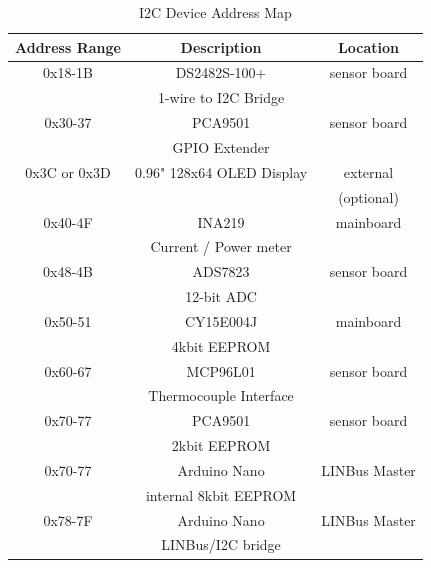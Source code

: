 \documentclass[lettersize,journal]{IEEEtran}
\begin{document}
\begin{table}
\begin{center}
\caption{I2C Device Address Map}
\label{i2c-addresses}
\begin{tabular}{| c | c | c |}
\hline
Address Range & Description & Location \\
\hline
0x18-1B & DS2482S-100+ & sensor board \\
& 1-wire to I2C Bridge & \\
\hline
0x30-37 & PCA9501 & sensor board \\
& GPIO Extender & \\
\hline
0x3C or 0x3D & 0.96" 128x64 OLED Display & external \\
& & (optional) \\
\hline
0x40-4F & INA219 & mainboard \\
& Current / Power meter & \\
\hline
0x48-4B & ADS7823 & sensor board \\
& 12-bit ADC & \\
\hline
0x50-51 & CY15E004J & mainboard \\
& 4kbit EEPROM & \\
\hline
0x60-67 & MCP96L01 & sensor board \\
& Thermocouple Interface & \\
\hline
0x70-77 & PCA9501 & sensor board \\
& 2kbit EEPROM & \\
\hline
0x70-77 & Arduino Nano & LINBus Master \\
& internal 8kbit EEPROM & \\
\hline
0x78-7F & Arduino Nano & LINBus Master \\
& LINBus/I2C bridge & \\
\hline
\end{tabular}
\end{center}
\end{table}
\end{document}
